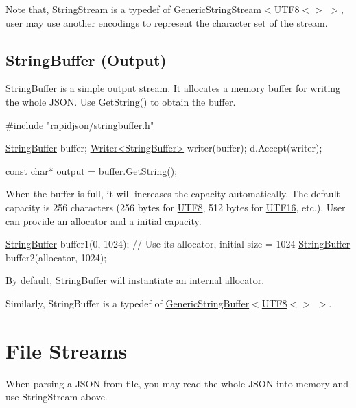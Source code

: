 Note that, {\ttfamily String\+Stream} is a typedef of {\ttfamily \hyperlink{struct_generic_string_stream}{Generic\+String\+Stream}$<$\hyperlink{struct_u_t_f8}{U\+T\+F8}$<$$>$ $>$}, user may use another encodings to represent the character set of the stream.\hypertarget{md_Commun_Externe_RapidJSON_doc_stream.zh-cn_StringBuffer}{}\subsection{String\+Buffer (\+Output)}\label{md_Commun_Externe_RapidJSON_doc_stream.zh-cn_StringBuffer}
{\ttfamily String\+Buffer} is a simple output stream. It allocates a memory buffer for writing the whole J\+S\+ON. Use {\ttfamily Get\+String()} to obtain the buffer.


\begin{DoxyCode}
\textcolor{preprocessor}{#include "rapidjson/stringbuffer.h"}

\hyperlink{class_generic_string_buffer}{StringBuffer} buffer;
\hyperlink{class_writer}{Writer<StringBuffer>} writer(buffer);
d.Accept(writer);

\textcolor{keyword}{const} \textcolor{keywordtype}{char}* output = buffer.GetString();
\end{DoxyCode}


When the buffer is full, it will increases the capacity automatically. The default capacity is 256 characters (256 bytes for \hyperlink{struct_u_t_f8}{U\+T\+F8}, 512 bytes for \hyperlink{struct_u_t_f16}{U\+T\+F16}, etc.). User can provide an allocator and a initial capacity.


\begin{DoxyCode}
\hyperlink{class_generic_string_buffer}{StringBuffer} buffer1(0, 1024); \textcolor{comment}{// Use its allocator, initial size = 1024}
\hyperlink{class_generic_string_buffer}{StringBuffer} buffer2(allocator, 1024);
\end{DoxyCode}


By default, {\ttfamily String\+Buffer} will instantiate an internal allocator.

Similarly, {\ttfamily String\+Buffer} is a typedef of {\ttfamily \hyperlink{class_generic_string_buffer}{Generic\+String\+Buffer}$<$\hyperlink{struct_u_t_f8}{U\+T\+F8}$<$$>$ $>$}.\hypertarget{md_Commun_Externe_RapidJSON_doc_stream.zh-cn_FileStreams}{}\section{File Streams}\label{md_Commun_Externe_RapidJSON_doc_stream.zh-cn_FileStreams}
When parsing a J\+S\+ON from file, you may read the whole J\+S\+ON into memory and use {\ttfamily String\+Stream} above.

